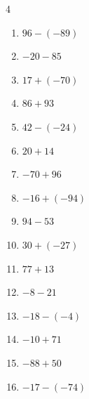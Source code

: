 \begin{multicols}{4}
\begin{enumerate}
        \phantom{$=-92$}

  \item $96-(-89)$

        \phantom{$=185$}

  \item $-20-85$

        \phantom{$=-105$}

  \item $17+(-70)$

        \phantom{$=-53$}

  \item $86+93$

        \phantom{$=179$}

  \item $42-(-24)$

        \phantom{$=66$}

  \item $20+14$

        \phantom{$=34$}

  \item $-70+96$

        \phantom{$=26$}

  \item $-16+(-94)$

        \phantom{$=-110$}

  \item $94-53$

        \phantom{$=41$}

  \item $30+(-27)$

        \phantom{$=3$}

  \item $77+13$

        \phantom{$=90$}

  \item $-8-21$

        \phantom{$=-29$}

\columnbreak %

  \item $-18-(-4)$

        \phantom{$=-14$}

  \item $-10+71$

        \phantom{$=61$}

  \item $-88+50$

        \phantom{$=-38$}

  \item $-17-(-74)$


\end{enumerate}
\end{multicols}

